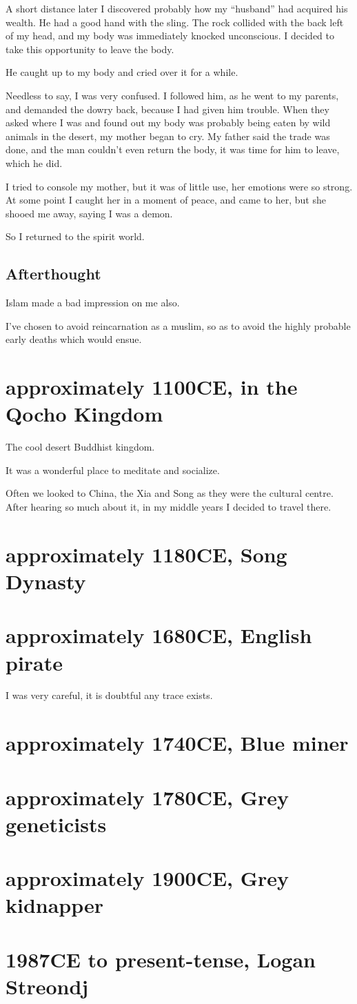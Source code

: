 A short distance later I discovered probably how my ``husband'' had acquired his
wealth. He had a good hand with the sling. The rock collided with the back left
of my head, and my body was immediately knocked unconscious. I decided to take
this opportunity to leave the body.

He caught up to my body and cried over it for a while.

Needless to say, I was very confused. I followed him, as he went to my parents,
and demanded the dowry back, because I had given him trouble. When they asked
where I was and found out my body was probably being eaten by wild animals in
the desert, my mother began to cry. My father said the trade was done, and the
man couldn't even return the body, it was time for him to leave, which he did.

I tried to console my mother, but it was of little use, her emotions were so
strong. At some point I caught her in a moment of peace, and came to her, but
she shooed me away, saying I was a demon.

So I returned to the spirit world.

\section{Afterthought}

Islam made a bad impression on me also. 

I've chosen to avoid reincarnation as a muslim, so as to avoid the highly
probable early deaths which would ensue. 

\chapter{approximately 1100CE, in the Qocho Kingdom}
The cool desert Buddhist kingdom.

It was a wonderful place to meditate and socialize. 

Often we looked to China, the Xia and Song as they were the cultural centre. 
After hearing so much about it, in my middle years I decided to travel there.

\chapter{approximately 1180CE, Song Dynasty}

\chapter{approximately 1680CE, English pirate}

I was very careful, it is doubtful any trace exists. 

\chapter{approximately 1740CE, Blue miner}
\chapter{approximately 1780CE, Grey geneticists}
\chapter{approximately 1900CE, Grey kidnapper}
\chapter{1987CE to present-tense, Logan Streondj}
